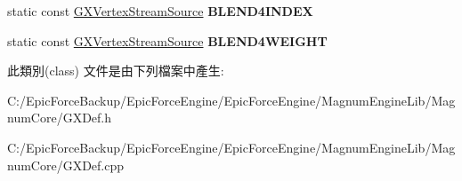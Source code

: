 \begin{DoxyCompactItemize}
\item 
static const \hyperlink{class_magnum_1_1_g_x_vertex_stream_source}{G\+X\+Vertex\+Stream\+Source} {\bfseries B\+L\+E\+N\+D4\+I\+N\+D\+EX}\hypertarget{class_magnum_1_1_g_x_vertex_stream_source_a0113a2a2df99c1c3396f5d8d1e147d4a}{}\label{class_magnum_1_1_g_x_vertex_stream_source_a0113a2a2df99c1c3396f5d8d1e147d4a}

\item 
static const \hyperlink{class_magnum_1_1_g_x_vertex_stream_source}{G\+X\+Vertex\+Stream\+Source} {\bfseries B\+L\+E\+N\+D4\+W\+E\+I\+G\+HT}\hypertarget{class_magnum_1_1_g_x_vertex_stream_source_afb7d509208055170943e20b2b0ccc50d}{}\label{class_magnum_1_1_g_x_vertex_stream_source_afb7d509208055170943e20b2b0ccc50d}

\end{DoxyCompactItemize}


此類別(class) 文件是由下列檔案中產生\+:\begin{DoxyCompactItemize}
\item 
C\+:/\+Epic\+Force\+Backup/\+Epic\+Force\+Engine/\+Epic\+Force\+Engine/\+Magnum\+Engine\+Lib/\+Magnum\+Core/G\+X\+Def.\+h\item 
C\+:/\+Epic\+Force\+Backup/\+Epic\+Force\+Engine/\+Epic\+Force\+Engine/\+Magnum\+Engine\+Lib/\+Magnum\+Core/G\+X\+Def.\+cpp\end{DoxyCompactItemize}
